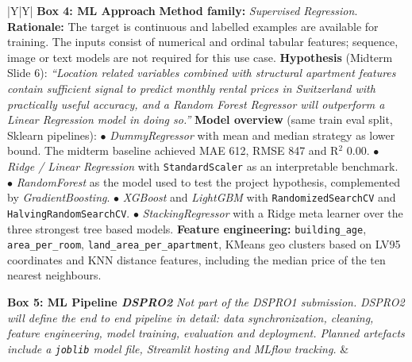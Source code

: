 \documentclass[11pt, a4paper]{article}
\begin{document}
{\begin{xltabular}{\textwidth}{|Y|Y|}
    \textbf{\color{accent}Box 4: ML Approach} \newline
    \textbf{Method family:} \emph{Supervised Regression}.
    \newline\newline
    \textbf{Rationale:} The target is continuous and labelled examples are available for training. The inputs consist of numerical and ordinal tabular features; sequence, image or text models are not required for this use case.
    \newline\newline
    \textbf{Hypothesis} (Midterm Slide 6): \emph{``Location related variables combined with structural apartment features contain sufficient signal to predict monthly rental prices in Switzerland with practically useful accuracy, and a Random Forest Regressor will outperform a Linear Regression model in doing so.''}
    \newline\newline
    \textbf{Model overview} (same train eval split, Sklearn pipelines):
    \newline $\bullet$ \emph{DummyRegressor} with mean and median strategy as lower bound. The midterm baseline achieved MAE 612, RMSE 847 and R$^2$ 0.00.
    \newline $\bullet$ \emph{Ridge / Linear Regression} with \texttt{StandardScaler} as an interpretable benchmark.
    \newline $\bullet$ \emph{RandomForest} as the model used to test the project hypothesis, complemented by \emph{GradientBoosting}.
    \newline $\bullet$ \emph{XGBoost} and \emph{LightGBM} with \texttt{RandomizedSearchCV} and \texttt{HalvingRandomSearchCV}.
    \newline $\bullet$ \emph{StackingRegressor} with a Ridge meta learner over the three strongest tree based models.
    \newline\newline
    \textbf{Feature engineering:} \texttt{building\_age}, \texttt{area\_per\_room}, \texttt{land\_area\_per\_apartment}, KMeans geo clusters based on LV95 coordinates and KNN distance features, including the median price of the ten nearest neighbours.
    \\ \hline

    \textbf{\color{outscope}Box 5: ML Pipeline \emph{DSPRO2}} \newline
    \textcolor{outscope}{\emph{Not part of the DSPRO1 submission.}}
    \newline\newline
    \textcolor{outscope}{\emph{DSPRO2 will define the end to end pipeline in detail: data synchronization, cleaning, feature engineering, model training, evaluation and deployment. Planned artefacts include a \texttt{joblib} model file, Streamlit hosting and MLflow tracking.}}
    &


\end{xltabular}}
\end{document}
